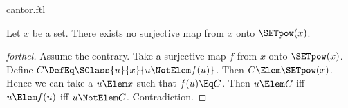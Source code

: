 \documentclass{stex}
\begin{document}
\begin{smodule}{cantor.ftl}


\begin{theorem}[forthel,title=Cantor's Theorem,name=Cantor I]
  Let $x$ be a set.
  There exists no surjective map from $x$ onto $\SETpow(x)$.
\end{theorem}
\begin{proof}[forthel]
  Assume the contrary.
  Take a surjective map $f$ from $x$ onto $\SETpow(x)$.
  Define $C \DefEq \SClass{u}{x}{u \NotElem f(u)}$.
  Then $C \Elem \SETpow(x)$.
  Hence we can take a $u \Elem x$ such that $f(u) \Eq C$.
  Then $u \Elem C$ iff $u \Elem f(u)$ iff $u \NotElem C$.
  Contradiction.
\end{proof}
\end{smodule}
\end{document}
